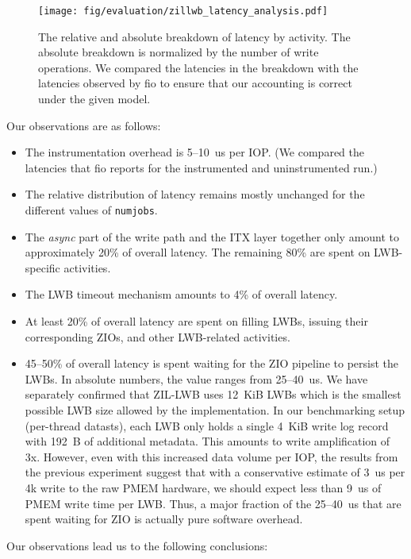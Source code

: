 \documentclass[12pt,a4paper,twoside]{book}
\begin{document}
\begin{figure}[H]
    \centering
    \texttt{[image: fig/evaluation/zillwb\_latency\_analysis.pdf]}
    \caption{The relative and absolute breakdown of latency by activity.
    The absolute breakdown is normalized by the number of write operations.
    We compared the latencies in the breakdown with the latencies observed by fio to ensure that our accounting is correct under the given model.
    }
    \label{fig:lwbanalysis:breakdown_charts}
\end{figure}

Our observations are as follows:
\begin{itemize}[noitemsep]
    \item The instrumentation overhead is 5--10~us per IOP. (We compared the latencies that fio reports for the instrumented and uninstrumented run.)
    \item The relative distribution of latency remains mostly unchanged for the different values of \lstinline{numjobs}.
    \item The \textit{async} part of the write path and the ITX layer together only amount to approximately 20\% of overall latency.
        The remaining 80\% are spent on LWB-specific activities.
    \item The LWB timeout mechanism amounts to 4\% of overall latency.
    \item At least 20\% of overall latency are spent on filling LWBs, issuing their corresponding ZIOs, and other LWB-related activities.
    \item 45--50\% of overall latency is spent waiting for the ZIO pipeline to persist the LWBs.
        In absolute numbers, the value ranges from 25--40~us.
        We have separately confirmed that ZIL-LWB uses 12~KiB LWBs which is the smallest possible LWB size allowed by the implementation.
        In our benchmarking setup (per-thread datasts), each LWB only holds a single 4~KiB write log record with 192~B of additional metadata.
        This amounts to write amplification of 3x.
        However, even with this increased data volume per IOP, the results from the previous experiment suggest that with a conservative estimate of 3~us per 4k write to the raw PMEM hardware, we should expect less than 9~us of PMEM write time per LWB.
        Thus, a major fraction of the 25--40~us that are spent waiting for ZIO is actually pure software overhead.
\end{itemize}

Our observations lead us to the following conclusions:
\end{document}
